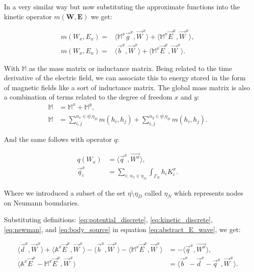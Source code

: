 In a very similar way but now substituting the approximate functions into the kinetic operator $m(\mathbf{W},\mathbf{E})$ we get:

\begin{align}
m\left(W_x,E_x\right)=&\langle \mathbb{M}^x\vec{g}^x,\vec{W}^x\rangle
+\langle\mathbb{M}^x\vec{E}^x,\vec{W}^x\rangle\nonumber, \\
m\left(W_x,E_x\right)=&\langle \vec{b}^x,\vec{W}^x\rangle
+\langle\mathbb{M}^x\vec{E}^x,\vec{W}^x\rangle. \label{eq:kinetic_discrete}
\end{align}

With $\mathbb{M}$ as the mass matrix or inductance matrix. Being related to the time derivative of the electric field, we can associate this to energy stored in the form of magnetic fields like a sort of inductance matrix. The global mass matrix is also a combination of terms related to the degree of freedom $x$ and $y$:
\begin{align*}
\mathbb{M} &= \mathbb{M}^x+\mathbb{M}^y,\\
\mathbb{M} &= \sum_{i,j}^{n_x \in \eta\setminus\eta_D} m(h_i,h_j)+\sum_{i,j}^{n_y \in \eta\setminus\eta_D} m(h_i,h_j).
\end{align*}

And the same follows with operator $q$:

\begin{align}
q(W_x) &= \langle \vec{q}^x, \vec{W^x}\rangle \label{eq:newman},\\
\vec{q}_i^x&= \sum_{i:\ n_x \in \eta_N}\int_{\Gamma_N} h_iK_i^x \nonumber.
\end{align}

Where we introduced a subset of the set $\eta  \setminus \eta_D$ called $\eta_N$ which represents nodes on Neumann boundaries.

Substituting definitions: \ref{eq:potential_discrete}, \ref{eq:kinetic_discrete}, \ref{eq:newman}, and \ref{eq:body_source} in equation \ref{eq:abstract_E_wave}, we get:

\begin{align}
\langle\vec{d}^x,\vec{W}^x\rangle
+\langle\mathbb{A}^x\vec{E}^x,\vec{W}^x\rangle-\langle \vec{b}^x,\vec{W}^x\rangle
-\langle\mathbb{M}^x\vec{E}^x,\vec{W}^x\rangle &= -\langle \vec{q}^x, \vec{W^x}\rangle \nonumber,\\
\langle\mathbb{A}^x\vec{E}^x- \mathbb{M}^x\vec{E}^x,\vec{W}^x \rangle &=\langle \vec{b}^x-\vec{d}^x-\vec{q}^x, \vec{W}^x \rangle.
\end{align}

